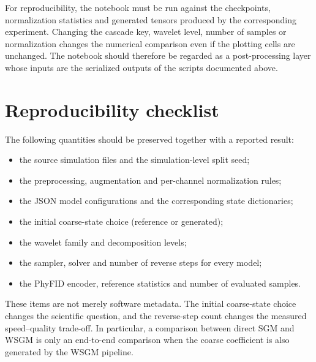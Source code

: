 For reproducibility, the notebook must be run against the checkpoints,
normalization statistics and generated tensors produced by the corresponding
experiment. Changing the cascade key, wavelet level, number of samples or
normalization changes the numerical comparison even if the plotting cells are
unchanged. The notebook should therefore be regarded as a post-processing
layer whose inputs are the serialized outputs of the scripts documented
above.

\section{Reproducibility checklist}

The following quantities should be preserved together with a reported result:

\begin{itemize}
\item the source simulation files and the simulation-level split seed;
\item the preprocessing, augmentation and per-channel normalization rules;
\item the JSON model configurations and the corresponding state dictionaries;
\item the initial coarse-state choice (reference or generated);
\item the wavelet family and decomposition levels;
\item the sampler, solver and number of reverse steps for every model;
\item the PhyFID encoder, reference statistics and number of evaluated samples.
\end{itemize}

These items are not merely software metadata. The initial coarse-state choice
changes the scientific question, and the reverse-step count changes the
measured speed--quality trade-off. In particular, a comparison between direct
SGM and WSGM is only an end-to-end comparison when the coarse coefficient is
also generated by the WSGM pipeline.
